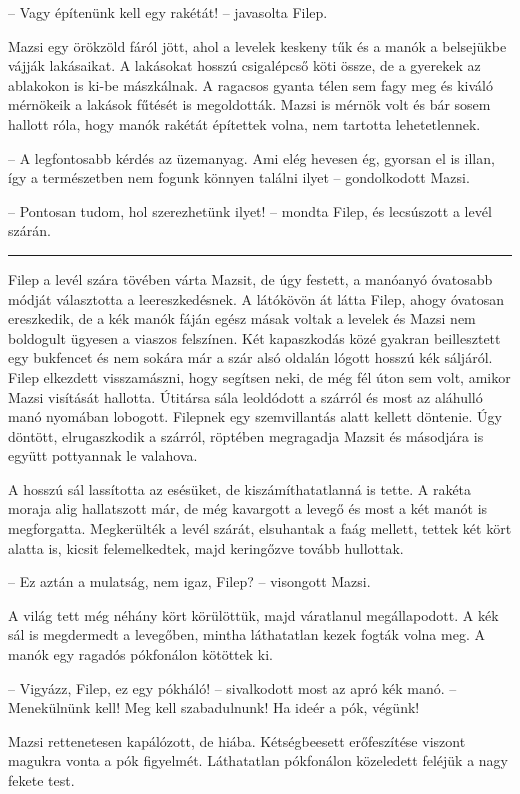 \documentclass[10pt]{memoir}
\renewcommand{\pfbreakdisplay}{\bigskip \ding{166} \bigskip}
\newcommand{\secbreak}{\fancybreak{\pfbreakdisplay}\indent}
\begin{document}
-- Vagy építenünk kell egy rakétát! -- javasolta Filep.

Mazsi egy örökzöld fáról jött, ahol a levelek keskeny tűk és a manók a
belsejükbe vájják lakásaikat. A lakásokat hosszú csigalépcső köti össze, de a
gyerekek az ablakokon is ki-be mászkálnak. A ragacsos gyanta télen sem fagy meg
és kiváló mérnökeik a lakások fűtését is megoldották. Mazsi is mérnök volt és
bár sosem hallott róla, hogy manók rakétát építettek volna, nem tartotta
lehetetlennek.

-- A legfontosabb kérdés az üzemanyag. Ami elég hevesen ég, gyorsan el is
illan, így a természetben nem fogunk könnyen találni ilyet -- gondolkodott
Mazsi.

-- Pontosan tudom, hol szerezhetünk ilyet! -- mondta Filep, és lecsúszott a
levél szárán.

\secbreak

Filep a levél szára tövében várta Mazsit, de úgy festett, a manóanyó óvatosabb
módját választotta a leereszkedésnek. A látókövön át látta Filep, ahogy
óvatosan ereszkedik, de a kék manók fáján egész másak voltak a levelek és Mazsi
nem boldogult ügyesen a viaszos felszínen. Két kapaszkodás közé gyakran
beillesztett egy bukfencet és nem sokára már a szár alsó oldalán lógott hosszú
kék sáljáról. Filep elkezdett visszamászni, hogy segítsen neki, de még fél úton
sem volt, amikor Mazsi visítását hallotta. Útitársa sála leoldódott a szárról
és most az aláhulló manó nyomában lobogott. Filepnek egy szemvillantás alatt
kellett döntenie. Úgy döntött, elrugaszkodik a szárról, röptében megragadja
Mazsit és másodjára is együtt pottyannak le valahova.

A hosszú sál lassította az esésüket, de kiszámíthatatlanná is tette. A rakéta
moraja alig hallatszott már, de még kavargott a levegő és most a két manót is
megforgatta. Megkerülték a levél szárát, elsuhantak a faág mellett, tettek két
kört alatta is, kicsit felemelkedtek, majd keringőzve tovább hullottak.

-- Ez aztán a mulatság, nem igaz, Filep? -- visongott Mazsi.

A világ tett még néhány kört körülöttük, majd váratlanul megállapodott. A kék
sál is megdermedt a levegőben, mintha láthatatlan kezek fogták volna meg. A
manók egy ragadós pókfonálon kötöttek ki.

-- Vigyázz, Filep, ez egy pókháló! -- sivalkodott most az apró kék manó. --
Menekülnünk kell! Meg kell szabadulnunk! Ha ideér a pók, végünk!

Mazsi rettenetesen kapálózott, de hiába. Kétségbeesett erőfeszítése viszont
magukra vonta a pók figyelmét. Láthatatlan pókfonálon közeledett feléjük a nagy
fekete test.
\end{document}
